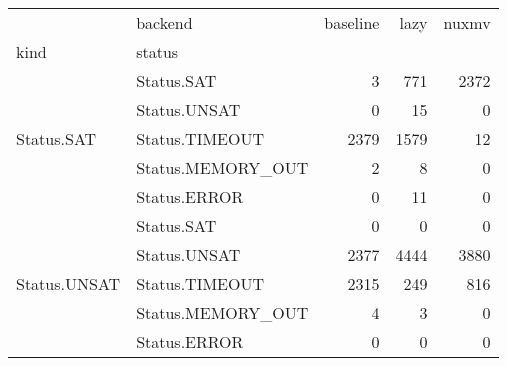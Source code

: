 \begin{tabular}{llrrr}
\toprule
 & backend & baseline & lazy & nuxmv \\
kind & status &  &  &  \\
\midrule
\multirow[c]{5}{*}{Status.SAT} & Status.SAT & 3 & 771 & 2372 \\
 & Status.UNSAT & 0 & 15 & 0 \\
 & Status.TIMEOUT & 2379 & 1579 & 12 \\
 & Status.MEMORY_OUT & 2 & 8 & 0 \\
 & Status.ERROR & 0 & 11 & 0 \\
\multirow[c]{5}{*}{Status.UNSAT} & Status.SAT & 0 & 0 & 0 \\
 & Status.UNSAT & 2377 & 4444 & 3880 \\
 & Status.TIMEOUT & 2315 & 249 & 816 \\
 & Status.MEMORY_OUT & 4 & 3 & 0 \\
 & Status.ERROR & 0 & 0 & 0 \\
\bottomrule
\end{tabular}
